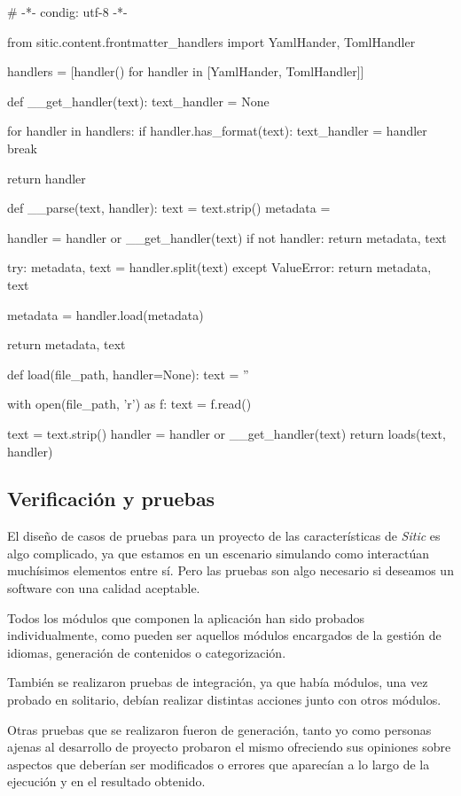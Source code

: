 \documentclass[a4paper,12pt]{article}
\begin{document}
\begin{pythoncode}
# -*- condig: utf-8 -*-

from sitic.content.frontmatter_handlers import YamlHander, TomlHandler


handlers = [handler() for handler in [YamlHander, TomlHandler]]

def __get_handler(text):
    text_handler = None

    for handler in handlers:
        if handler.has_format(text):
            text_handler = handler
            break

    return handler


def __parse(text, handler):
    text = text.strip()
    metadata = {}

    handler = handler or __get_handler(text)
    if not handler:
        return metadata, text


    try:
        metadata, text = handler.split(text)
    except ValueError:
        return metadata, text

    metadata = handler.load(metadata)

    return metadata, text


def load(file_path, handler=None):
    text = ''

    with open(file_path, 'r') as f:
        text = f.read()

    text = text.strip()
    handler = handler or __get_handler(text)
    return loads(text, handler)
\end{pythoncode}

\subsection{Verificación y pruebas}

El diseño de casos de pruebas para un proyecto de las características de \emph{Sitic}
es algo complicado, ya que estamos en un escenario simulando como interactúan muchísimos
elementos entre sí. Pero las pruebas son algo necesario si deseamos un software con una
calidad aceptable.

Todos los módulos que componen la aplicación han sido probados individualmente, como pueden
ser aquellos módulos encargados de la gestión de idiomas, generación de contenidos o categorización.

También se realizaron pruebas de integración, ya que había módulos, una vez probado en solitario,
debían realizar distintas acciones junto con otros módulos.

Otras pruebas que se realizaron fueron de generación, tanto yo como
personas ajenas al desarrollo de proyecto probaron el
mismo ofreciendo sus opiniones sobre aspectos que deberían ser modificados o
errores que aparecían a lo largo de la ejecución y en el resultado obtenido.
\end{document}
